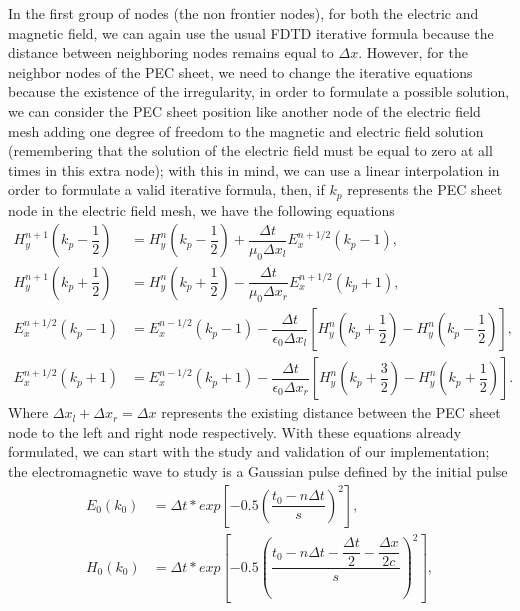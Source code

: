 \documentclass[12pt, oneside]{book}
\begin{document}
In the first group of nodes (the non frontier nodes), for both the electric and magnetic field, we can again use the usual FDTD iterative formula because the distance between neighboring nodes remains equal to $\Delta x$. However, for the neighbor nodes of the PEC sheet, we need to change the iterative equations because the existence of the irregularity, in order to formulate a possible solution, we can consider the PEC sheet position like another node of the electric field mesh adding one degree of freedom to the magnetic and electric field solution (remembering that the solution of the electric field must be equal to zero at all times in this extra node); with this in mind, we can use a linear interpolation in order to formulate a valid iterative formula, then, if $k_p$ represents the PEC sheet node in the electric field mesh, we have the following equations
\begin{align}
    H_y^{n+1} \left( k_p - \dfrac{1}{2} \right) &= H_y^{n} \left( k_p - \dfrac{1}{2} \right) + \dfrac{\Delta t}{\mu_0 \Delta x_l}E_x^{n+1/2}(k_p - 1), \\
    H_y^{n+1} \left( k_p + \dfrac{1}{2} \right) &= H_y^{n} \left( k_p + \dfrac{1}{2} \right) - \dfrac{\Delta t}{\mu_0 \Delta x_r}E_x^{n+1/2}(k_p + 1), \\
    E_x^{n+1/2}(k_p - 1) &= E_x^{n-1/2}(k_p - 1) - \dfrac{\Delta t}{\epsilon_0 \Delta x_l} \left[  H_y^{n} \left( k_p + \dfrac{1}{2} \right) -  H_y^{n} \left( k_p - \dfrac{1}{2} \right) \right], \\
    E_x^{n+1/2}(k_p + 1) &= E_x^{n-1/2}(k_p + 1) - \dfrac{\Delta t}{\epsilon_0 \Delta x_r} \left[  H_y^{n} \left( k_p + \dfrac{3}{2} \right) -  H_y^{n} \left( k_p + \dfrac{1}{2} \right) \right].
\end{align}
Where $\Delta x_l + \Delta x_r = \Delta x$ represents the existing distance between the PEC sheet node to the left and right node respectively. With these equations already formulated, we can start with the study and validation of our implementation; the electromagnetic wave to study is a Gaussian pulse defined by the initial pulse
\begin{align}
    E_0 (k_0) &= \Delta t * exp \left[-0.5 \left( \dfrac{t_0 - n \Delta t}{s} \right)^2 \right], \\
    H_0 (k_0) &= \Delta t * exp \left[-0.5 \left( \dfrac{t_0 - n \Delta t - \dfrac{\Delta t}{2} - \dfrac{\Delta x}{2c}}{s} \right)^2 \right],
\end{align}
\end{document}
